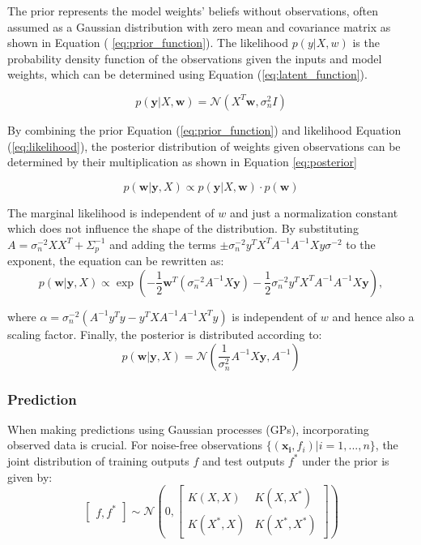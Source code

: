 The prior represents the model weights' beliefs without observations, often assumed as a Gaussian distribution with zero mean and covariance matrix as shown in Equation ( \ref{eq:prior_function}). The likelihood \( p(y | X, w) \) is the probability density function of the observations given the inputs and model weights, which can be determined using Equation (\ref{eq:latent_function}). 

\begin{equation}\label{eq:likelihood}
     p(\mathbf{y} | X, \mathbf{w}) = \mathcal{N}(X^T\mathbf{w}, \sigma^2_n I)
\end{equation}

By combining the prior Equation (\ref{eq:prior_function}) and likelihood Equation (\ref{eq:likelihood}), the posterior distribution of weights given observations  can be determined by their multiplication as shown in Equation \ref{eq:posterior}

\begin{equation}\label{eq:posterior}
    p(\mathbf{w} | \mathbf{y}, X) \propto p(\mathbf{y} | X, \mathbf{w}) \cdot p(\mathbf{w})
\end{equation}

The marginal likelihood is independent of \( w \) and just a normalization constant which does not influence the shape of the distribution. By substituting $A = \sigma^{-2}_n XX^T + \Sigma^{-1}_p$ and adding the terms $\pm \sigma^{-2}_n y^TX^TA^{-1}A^{-1}Xy \sigma^{-2}$ to the exponent, the equation can be rewritten as:
\begin{equation}
    p(\mathbf{w|y},X) \propto \exp\left(-\frac{1}{2} \mathbf{w}^T \left(\sigma^{-2}_n A^{-1}X\mathbf{y}\right) - \frac{1}{2} \sigma^{-2}_n y^TX^TA^{-1}A^{-1}X\mathbf{y}\right),
\end{equation}

where \( \alpha = \sigma^{-2}_n (A^{-1} y^T y - y^T X A^{-1}A^{-1} X^T y) \) is independent of \( w \) and hence also a scaling factor. Finally, the posterior is distributed according to:
\begin{equation}\label{eq:posterior_distrubtion}
     p(\mathbf{w | y}, X) = \mathcal{N}\left(\frac{1}{\sigma^2_n} A^{-1} X\mathbf{y}, A^{-1}\right)
\end{equation}



\subsubsection{Prediction}
When making predictions using Gaussian processes (GPs), incorporating observed data is crucial. For noise-free observations $\{(\mathbf{x_i}, f_i) | i = 1,...,n\}$, the joint distribution of training outputs $f$ and test outputs $f^*$ under the prior is given by:
\begin{equation}\label{eq:noisefree_joint_distrubtion}
    \begin{bmatrix}f, f^*\end{bmatrix} \sim \mathcal{N} \left(0, \begin{bmatrix} K(X,X) & K(X,X^*) \\ K(X^*,X) & K(X^*,X^*) \end{bmatrix} \right)
\end{equation}

